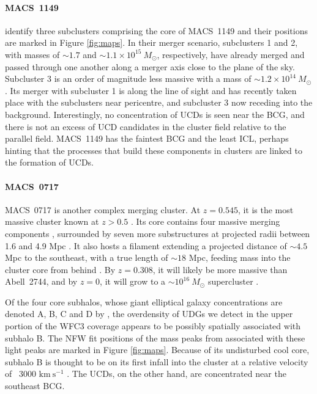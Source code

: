 \documentclass[iop,tighten,twocolumn,apj,floatfix]{emulateapj}
\begin{document}
\paragraph{MACS~1149} \cite{golovich2016} identify three subclusters
comprising the core of MACS~1149 and their positions are marked in Figure
\ref{fig:maps}.
In their merger scenario, subclusters 1 and 2, with masses of ${\sim}1.7$ and
${\sim}1.1 \times 10^{15}~M_{\odot}$, respectively, have already merged and
passed through one another along a merger axis close to the plane of the sky.
Subcluster 3 is an order of magnitude less massive with a mass of ${\sim}1.2
\times 10^{14}~M_{\odot}$. Its merger with subcluster 1 is along the line of
sight and has recently taken place with the subclusters near pericentre, and
subcluster 3 now receding into the background.
Interestingly, no concentration of UCDs is seen near the BCG, and there is not
an excess of UCD candidates in the cluster field relative to the parallel
field.
MACS~1149 has the faintest BCG and the least ICL, perhaps hinting that the
processes that build these components in clusters are linked to the formation
of UCDs.

\paragraph{MACS~0717} MACS~0717 is another complex merging cluster. At
$z=0.545$, it is
the most massive cluster known at $z > 0.5$ \citep{edge2003, ebeling2004,
ebeling2007, jauzac2018}. Its
core contains four massive merging components \citep{ma2009, limousin2012},
surrounded by seven more substructures at
projected radii between 1.6 and 4.9 Mpc \citep{jauzac2018}. It also hosts a
filament extending a projected distance of ${\sim}4.5$ Mpc to the southeast,
with a true length of ${\sim}18$ Mpc, feeding mass into the cluster core from
behind \citep{ebeling2004,jauzac2012}. By $z=0.308$, it will likely be more massive
than Abell~2744, and by $z=0$, it will grow to a ${\sim}10^{16}~M_{\odot}$
supercluster \citep{jauzac2018}.

Of the four core subhalos, whose giant elliptical galaxy concentrations are
denoted A, B, C and D by \cite{ma2009}, the overdensity of UDGs we detect in
the upper portion of the WFC3 coverage appears to be possibly spatially
associated with subhalo B. 
The NFW fit positions of the mass peaks from \cite{limousin2016} associated
with these light peaks are marked in Figure \ref{fig:maps}.
Because of its undisturbed cool core, subhalo B is thought to be on its first
infall into the cluster at a relative velocity of ~3000
$\mathrm{km}~\mathrm{s}^{-1}$ \citep{ma2009}.
The UCDs, on the other hand, are concentrated near the southeast BCG.\\
\end{document}
